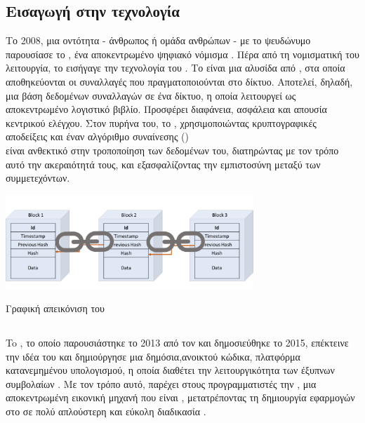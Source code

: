 \subsection{Εισαγωγή στην τεχνολογία }
Το 2008, μια οντότητα - άνθρωπος ή ομάδα ανθρώπων - με το ψευδώνυμο  παρουσίασε το , ένα αποκεντρωμένο ψηφιακό νόμισμα \cite{ref9}. Πέρα από τη νομισματική του λειτουργία, το  εισήγαγε την τεχνολογία του . 
Το  είναι μια αλυσίδα από , στα οποία αποθηκεύονται οι συναλλαγές που πραγματοποιούνται στο δίκτυο. Αποτελεί, δηλαδή, μια βάση δεδομένων συναλλαγών σε ένα δίκτυο, η οποία λειτουργεί ως αποκεντρωμένο λογιστικό βιβλίο. Προσφέρει διαφάνεια, ασφάλεια και απουσία κεντρικού ελέγχου. Στον πυρήνα του, το , χρησιμοποιώντας κρυπτογραφικές αποδείξεις και έναν αλγόριθμο συναίνεσης () \cite{ref10} \\είναι ανθεκτικό στην τροποποίηση των δεδομένων του, διατηρώντας με τον τρόπο αυτό την ακεραιότητά τους, και εξασφαλίζοντας την εμπιστοσύνη μεταξύ των συμμετεχόντων. 

\begin{illustration}
    \centering
    \includegraphics[width=0.7\textwidth]{figures/figure-001.png}
    \caption{Γραφική απεικόνιση του } 
    \cite{ref11} 
\end{illustration}


\subsection{}
To , το οποίο παρουσιάστηκε το 2013 από τον  και δημοσιεύθηκε το 2015, επέκτεινε την ιδέα του  και δημιούργησε μια δημόσια,ανοικτού κώδικα, πλατφόρμα κατανεμημένου υπολογισμού, η οποία διαθέτει την λειτουργικότητα των έξυπνων συμβολαίων \cite{ref12,ref13}. Με τον τρόπο αυτό, παρέχει στους προγραμματιστές την , μια αποκεντρωμένη εικονική μηχανή που είναι , μετατρέποντας τη δημιουργία εφαρμογών στο  σε πολύ απλούστερη και εύκολη διαδικασία \cite{ref14}.


